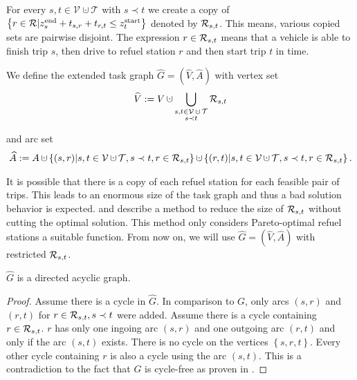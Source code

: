 \begin{definition}
\label{def:extended_taskgraph}

For every $s,t\in\mathcal{V}\cupdot\mathcal{T}$ with $s\prec t$ we create a copy of $\left\{r\in\mathcal{R}|z^{\operatorname{end}}_s+t_{s,r}+t_{r,t}\leq z^{\operatorname{start}}_t\right\}$ denoted by $\mathcal{R}_{s,t}$. This means, various copied sets are pairwise disjoint. The expression $r\in\mathcal{R}_{s,t}$ means that a vehicle is able to finish trip $s$, then drive to refuel station $r$ and then start trip $t$ in time.

We define the extended task graph $\widehat{G}=\left(\widehat{V},\widehat{A}\right)$ with vertex set
\begin{align*}
	\widehat{V}:=V\cupdot\Cupdot_{\substack{s,t\in\mathcal{V}\cupdot\mathcal{T} \\ s\prec t}} \Rst
\end{align*}

and arc set
\begin{align*}
	\widehat{A}:=A\cupdot\left\{(s,r)|s,t\in\mathcal{V}\cupdot\mathcal{T},s\prec t,r\in\Rst\right\}\cupdot\left\{(r,t)|s,t\in\mathcal{V}\cupdot\mathcal{T},s\prec t,r\in\Rst\right\}.
\end{align*}

It is possible that there is a copy of each refuel station for each feasible pair of trips. This leads to an enormous size of the task graph and thus a bad solution behavior is expected. \cite{Kaiser} and \cite{Knoll} describe a method to reduce the size of $\mathcal{R}_{s,t}$ without cutting the optimal solution. This method only considers Pareto-optimal refuel stations \wrt a suitable function. From now on, we will use $\widehat{G}=\left(\widehat{V},\widehat{A}\right)$ with restricted $\mathcal{R}_{s,t}$.

\end{definition}

\begin{lemma}

$\widehat{G}$ is a directed acyclic graph.

\end{lemma}

\begin{proof}

Assume there is a cycle in $\widehat{G}$. In comparison to $G$, only arcs $(s,r)$ and $(r,t)$ for ${r\in\mathcal{R}_{s,t}, s\prec t}$ were added. Assume there is a cycle containing $r\in\mathcal{R}_{s,t}$. $r$ has only one ingoing arc $(s,r)$ and one outgoing arc $(r,t)$ and only if the arc $(s,t)$ exists. There is no cycle on the vertices $\left\{s,r,t\right\}$. Every other cycle containing $r$ is also a cycle using the arc $(s,t)$. This is a contradiction to the fact that $G$ is cycle-free as proven in .

\end{proof}


